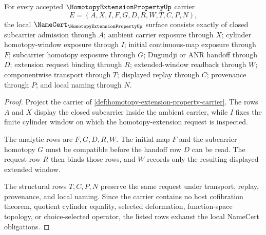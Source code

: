 \begin{theorem}
\label{thm:homotopy-extension-property-namecert-obligations}
For every accepted $\HomotopyExtensionPropertyUp$ carrier
$$
E=(A,X,I,F,G,D,R,W,T,C,P,N),
$$
the local $\NameCert_{\HomotopyExtensionPropertyUp}$ surface consists exactly of closed subcarrier admission through $A$; ambient carrier exposure through $X$; cylinder homotopy-window exposure through $I$; initial continuous-map exposure through $F$; subcarrier homotopy exposure through $G$; Dugundji or ANR handoff through $D$; extension request binding through $R$; extended-window readback through $W$; componentwise transport through $T$; displayed replay through $C$; provenance through $P$; and local naming through $N$.
\end{theorem}
\begin{proof}
Project the carrier of \autoref{def:homotopy-extension-property-carrier}. The rows $A$ and $X$ display the closed subcarrier inside the ambient carrier, while $I$ fixes the finite cylinder window on which the homotopy-extension request is inspected.

The analytic rows are $F,G,D,R,W$. The initial map $F$ and the subcarrier homotopy $G$ must be compatible before the handoff row $D$ can be read. The request row $R$ then binds those rows, and $W$ records only the resulting displayed extended window.

The structural rows $T,C,P,N$ preserve the same request under transport, replay, provenance, and local naming. Since the carrier contains no host cofibration theorem, quotient cylinder equality, selected deformation, function-space topology, or choice-selected operator, the listed rows exhaust the local NameCert obligations.
\end{proof}

